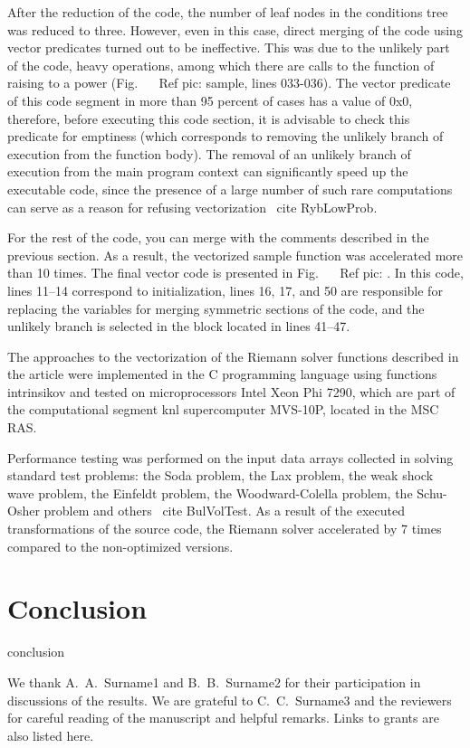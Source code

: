 \documentclass[
11pt,%
tightenlines,%
twoside,%
onecolumn,%
nofloats,%
nobibnotes,%
nofootinbib,%
superscriptaddress,%
noshowpacs,%
centertags]%
{revtex4}
\begin{document}
After the reduction of the code, the number of leaf nodes in the conditions tree was reduced to three. However, even in this case, direct merging of the code using vector predicates turned out to be ineffective. This was due to the unlikely part of the code, heavy operations, among which there are calls to the function of raising to a power (Fig. ~ \ Ref {pic: sample}, lines 033-036). The vector predicate of this code segment in more than 95 percent of cases has a value of 0x0, therefore, before executing this code section, it is advisable to check this predicate for emptiness (which corresponds to removing the unlikely branch of execution from the function body). The removal of an unlikely branch of execution from the main program context can significantly speed up the executable code, since the presence of a large number of such rare computations can serve as a reason for refusing vectorization \ cite {RybLowProb}.

For the rest of the code, you can merge with the comments described in the previous section. As a result, the vectorized sample function was accelerated more than 10 times. The final vector code is presented in Fig. ~ \ Ref {pic: }. In this code, lines 11–14 correspond to initialization, lines 16, 17, and 50 are responsible for replacing the variables for merging symmetric sections of the code, and the unlikely branch is selected in the block located in lines 41–47.

The approaches to the vectorization of the Riemann solver functions described in the article were implemented in the C programming language using functions intrinsikov and tested on microprocessors Intel Xeon Phi 7290, which are part of the computational segment knl supercomputer MVS-10P, located in the MSC RAS.

Performance testing was performed on the input data arrays collected in solving standard test problems: the Soda problem, the Lax problem, the weak shock wave problem, the Einfeldt problem, the Woodward-Colella problem, the Schu-Osher problem and others \ cite {BulVolTest}. As a result of the executed transformations of the source code, the Riemann solver accelerated by 7 times compared to the non-optimized versions.

\section{Conclusion}

conclusion

\begin{acknowledgments}
We thank A.~A.~Surname1 and B.~B.~Surname2 for their participation in discussions of the results. We are grateful to C.~C.~Surname3 and the reviewers for careful reading of the manuscript and helpful remarks. Links to grants are also listed here.
\end{acknowledgments}
\end{document}

